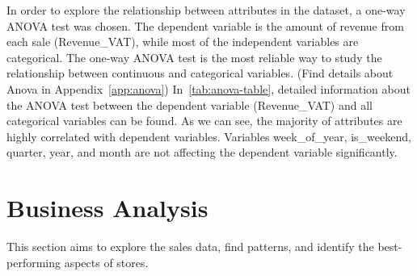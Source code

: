 \documentclass[conference]{IEEEtran}
\begin{document}

In order to explore the relationship between attributes in the dataset,  a one-way ANOVA test was chosen. The dependent variable is the amount of revenue from each sale (Revenue\_VAT), while most of the independent variables are categorical. The one-way ANOVA test is the most reliable way to study the relationship between continuous and categorical variables. (Find details about Anova in Appendix~\autoref{app:anova}) In~\autoref{tab:anova-table}, detailed information about the ANOVA test between the dependent variable (Revenue\_VAT) and all categorical variables can be found. As we can see, the majority of attributes are highly correlated with dependent variables. Variables week\_of\_year, is\_weekend, quarter, year, and month are not affecting the dependent variable significantly.



\section{Business Analysis}
This section aims to explore the sales data, find patterns, and identify the best-performing aspects of stores.


\end{document}
